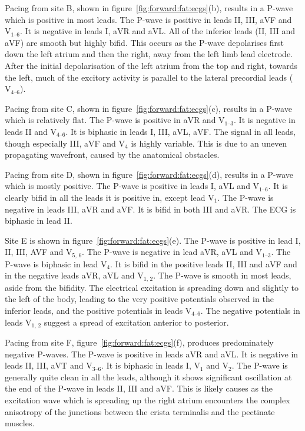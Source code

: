 Pacing from site B, shown in figure~\ref{fig:forward:fat:ecgs}(b), results in a
P-wave which is positive in most leads.
The P-wave is positive in leads II, III, aVF and $\text{V}_{\text{1--6}}$.
It is negative in leads I, aVR and aVL.
All of the inferior leads (II, III and aVF) are smooth but highly bifid.
This occurs as the P-wave depolarises first down the left atrium and then the
right, away from the left limb lead electrode.
After the initial depolarisation of the left atrium from the top and right,
towards the left, much of the excitory activity is parallel to the lateral
precordial leads ($\text{V}_{\text{4--6}}$).

Pacing from site C, shown in figure~\ref{fig:forward:fat:ecgs}(c), results in a
P-wave which is relatively flat.
The P-wave is positive in aVR and $\text{V}_{\text{1--3}}$.
It is negative in leads II and $\text{V}_{\text{4--6}}$.
It is biphasic in leads I, III, aVL, aVF.
The signal in all leads, though especially III, aVF and $\text{V}_{\text{4}}$ is
highly variable.
This is due to an uneven propagating wavefront, caused by the anatomical
obstacles.

Pacing from site D, shown in figure~\ref{fig:forward:fat:ecgs}(d), results in a
P-wave which is mostly positive.
The P-wave is positive in leads I, aVL and $\text{V}_{\text{1--6}}$.
It is clearly bifid in all the leads it is positive in, except lead
$\text{V}_{\text{1}}$.
The P-wave is negative in leads III, aVR and aVF.
It is bifid in both III and aVR.
The ECG is biphasic in lead II.

Site E is shown in figure~\ref{fig:forward:fat:ecgs}(e).
The P-wave is positive in lead I, II, III, AVF and $\text{V}_{\text{5, 6}}$.
The P-wave is negative in lead aVR, aVL and $\text{V}_{\text{1--3}}$.
The P-wave is biphasic in lead $\text{V}_{\text{4}}$.
It is bifid in the positive leads II, III and aVF and in the negative leads aVR,
aVL and $\text{V}_{\text{1, 2}}$.
The P-wave is smooth in most leads, aside from the bifidity.
The electrical excitation is spreading down and slightly to the left of the
body, leading to the very positive potentials observed in the inferior leads,
and the positive potentials in leads $\text{V}_{\text{4--6}}$.
The negative potentials in leads $\text{V}_{\text{1, 2}}$ suggest a spread of
excitation anterior to posterior.

Pacing from site F, figure~\ref{fig:forward:fat:ecgs}(f), produces predominately
negative P-waves.
The P-wave is positive in leads aVR and aVL.
It is negative in leads II, III, aVT and $\text{V}_{\text{3--6}}$.
It is biphasic in leads I, $\text{V}_{\text{1}}$ and $\text{V}_{\text{2}}$.
The P-wave is generally quite clean in all the leads, although it shows
significant oscillation at the end of the P-wave in leads II, III and aVF.
This is likely causes as the excitation wave which is spreading up the right
atrium encounters the complex anisotropy of the junctions between the crista
terminalis and the pectinate muscles.


